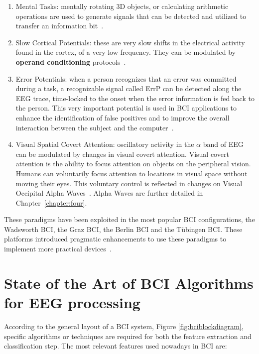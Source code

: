 \begin{enumerate}
\item Mental Tasks: mentally rotating 3D objects, or calculating arithmetic operations are used to generate signals that can be detected and utilized to transfer an information bit~\cite{Shin2018}.
\item Slow Cortical Potentials: these are very slow shifts in the electrical activity found in the cortex, of a very low frequency.  They can be modulated by \textbf{operand conditioning} protocols~\cite{WolpawJonathanR2012}.
\item Error Potentials: when a person recognizes that an error was committed during a task, a recognizable signal called ErrP can be detected along the EEG trace, time-locked to the onset when the error information is fed back to the person.  This very important potential is used in BCI applications to enhance the identification of false positives and to improve the overall interaction between the subject and the computer~\cite{Cruz2018}.
\item Visual Spatial Covert Attention: oscillatory activity in the $\alpha$ band of EEG can be modulated by changes in visual covert attention.  Visual covert attention is the ability to focus attention on objects on the peripheral vision.  Humans can voluntarily focus attention to locations in visual space without moving their eyes.  This voluntary control is reflected in changes on Visual Occipital Alpha Waves~\cite{c62}.  Alpha Waves are further detailed in Chapter~\ref{chapter:four}.
\end{enumerate}

These paradigms have been exploited in the most popular BCI configurations, the Wadsworth BCI, the Graz BCI, the Berlin BCI and the Tübingen BCI.  These platforms introduced pragmatic enhancements to use these paradigms to implement more practical devices~\cite{Nam2018,Schomer2010,Blankertz2008,Pfurtscheller2003,Neumann2003,Vaughan2006}.



\section{State of the Art of BCI Algorithms for EEG processing}

According to the general layout of a BCI system, Figure \ref{fig:bciblockdiagram}, specific algorithms or techniques are required for both the feature extraction and classification step.  The most relevant features used nowadays in BCI are:

